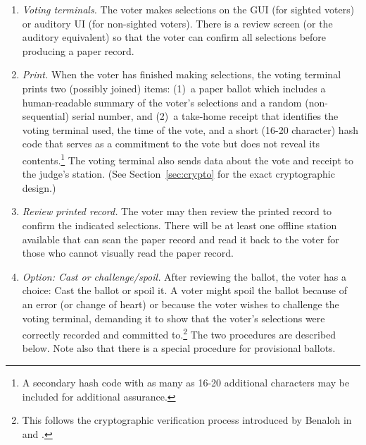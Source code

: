 \begin{enumerate}
\item {\em Voting terminals.}
 The voter makes selections on the GUI (for sighted voters)
 or auditory UI (for non-sighted voters).
 There is a review screen (or the auditory equivalent)
 so that the voter can confirm all selections before producing a paper record.

\item {\em Print.} When the voter has finished making selections,
  the voting terminal prints two (possibly joined) items:
  (1)~a paper ballot which includes a human-readable summary of the voter's selections
  and a random (non-sequential) serial number, and
  (2)~a take-home receipt that identifies the voting terminal used, the
  time of the vote, and a short (16-20 character) hash code that
  serves as a commitment to the vote but does not reveal its contents.\footnote{A secondary hash code with as many as 16-20 additional characters may be included for additional assurance.}
  The voting terminal also sends data about the vote and receipt
  to the judge's station. (See Section~\ref{sec:crypto} for the exact
  cryptographic design.)


 
% 

\item {\em Review printed record.}
The voter may then review the printed record to confirm the indicated
selections. 
There will be at least one offline station available that can 
scan the paper record and read it back to the 
voter for those who cannot visually read the paper record.

\item {\em Option: Cast or challenge/spoil.}
After reviewing the ballot, the voter has a choice: Cast the ballot or spoil it.
 A voter might spoil the ballot because of an error (or change of heart)
 or because the voter wishes to challenge the voting terminal, demanding it to show
 that the voter's selections were correctly recorded and committed to.\footnote{%
 This follows the cryptographic verification process introduced by Benaloh
 in \cite{benaloh06simple} and \cite{benaloh07evt}.
 }
 The two procedures are described below. 
 Note also that there is a special procedure for provisional ballots.


\end{enumerate}
